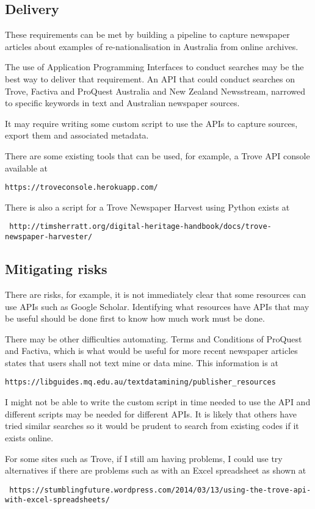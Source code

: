 \documentclass{article}
\begin{document}
\subsection*{Delivery}

These requirements can be met by building a pipeline to capture newspaper articles about examples of re-nationalisation in Australia from online archives.\par

The use of Application Programming Interfaces to conduct searches may be the best way to deliver that requirement. An API that could conduct searches on Trove, Factiva and ProQuest Australia and New Zealand Newsstream, narrowed to specific keywords in text and Australian newspaper sources.\par
It may require writing some custom script to use the APIs to capture sources, export them and associated metadata.\par 
There are some existing tools that can be used, for example, a Trove API console available at \begin{verbatim}https://troveconsole.herokuapp.com/\end{verbatim} There is also a script for a Trove Newspaper Harvest using Python exists at \begin{verbatim} http://timsherratt.org/digital-heritage-handbook/docs/trove-newspaper-harvester/\end{verbatim}

\subsection*{Mitigating risks}

There are risks, for example, it is not immediately clear that some resources can use APIs such as Google Scholar. Identifying what resources have APIs that may be useful should be done first to know how much work must be done.\par
There may be other difficulties automating. Terms and Conditions of ProQuest and Factiva, which is what would be useful for more recent newspaper articles states that users shall not text mine or data mine. This information is at \begin{verbatim}https://libguides.mq.edu.au/textdatamining/publisher_resources\end{verbatim}
I might not be able to write the custom script in time needed to use the API and different scripts may be needed for different APIs. It is likely that others have tried similar searches so it would be prudent to search from existing codes if it exists online.\par
For some sites such as Trove, if I still am having problems, I could use try alternatives if there are problems such as with an Excel spreadsheet as shown at \begin{verbatim} https://stumblingfuture.wordpress.com/2014/03/13/using-the-trove-api-with-excel-spreadsheets/ \end{verbatim}\par
\end{document}

